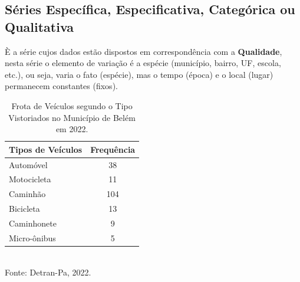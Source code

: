 \subsection{Séries Específica, Especificativa, Categórica ou Qualitativa}

\inic È a série cujos dados estão dispostos em correspondência com a \textbf{Qualidade}, nesta série o elemento de variação é a espécie (município, bairro, UF, escola, etc.), ou seja, varia o fato (espécie), mas o tempo (época) e o local (lugar) permanecem constantes (fixos).


\begin{table}[!htb]
    \centering
    {
    \caption{Frota de Veículos segundo o Tipo Vistoriados no Município de Belém em 2022.}
    \label{obitos2}
    \vspace{0.1cm}
\begin{tabular}{l|c}
  \hline\hline
  Tipos de Veículos   & Frequência  \\
  \hline\hline
  Automóvel     &  38 \\
  Motocicleta   &  11 \\
  Caminhão      &  104 \\
  Bicicleta     &  13 \\
  Caminhonete   &  9 \\
  Micro-ônibus  &  5 \\
  \hline\hline
\end{tabular}}
\\
\hspace{-2.0cm} Fonte: Detran-Pa, 2022.
\end{table}







